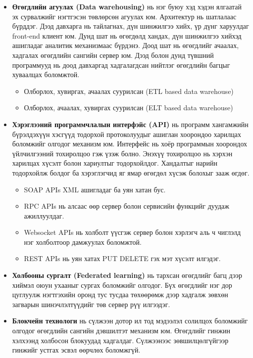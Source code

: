 \begin{itemize}
    \item \textbf{Өгөгдлийн агуулах (Data warehousing)} нь нэг буюу хэд хэдэн ялгаатай эх сурвалжийг нэгтгэсэн төвлөрсөн агуулах юм. Архитектур нь шатлалаас бүрддэг. Дээд давхарга нь тайлагнах, дүн шинжилгээ хийх, үр дүнг харуулдаг front-end клиент юм. Дунд шат нь өгөгдөлд хандах, дүн шинжилгээ хийхэд ашигладаг аналитик механизмаас бүрдэнэ. Доод шат нь өгөгдлийг ачаалах, хадгалах өгөгдлийн сангийн сервер юм. Дээд болон дунд түвшний программууд нь доод давхаргад хадгалагдсан нийтлэг өгөгдлийн багцыг хуваалцах боломжтой.
          \begin{itemize}
              \item Олборлох, хувиргах, ачаалах суурилсан (ETL based data warehouse)
              \item Олборлох, ачаалах, хувиргах суурилсан (ELT based data warehouse)
          \end{itemize}

    \item \textbf{Хэрэглээний программчлалын интерфэйс (API)} нь программ хангамжийн бүрэлдэхүүн хэсгүүд тодорхой протоколуудыг ашиглан хоорондоо харилцах боломжийг олгодог механизм юм. Интерфейс нь хоёр программын хоорондох үйлчилгээний тохиролцоо гэж үзэж болно. Энэхүү тохиролцоо нь хэрхэн харилцах хүсэлт болон хариултыг тодорхойлдог. Хандалтыг нарийн тодорхойлж болдог ба хэрэглэгчид яг ямар өгөгдөл хүсэж болохыг зааж өгдөг.
          \begin{itemize}
              \item SOAP APIs XML ашигладаг ба уян хатан бус.
              \item RPC APIs нь алсаас өөр сервер болон сервисийн функцийг дуудаж ажиллуулдаг.
              \item Websocket APIs нь холболт үүсгэж сервер болон хэрлэгч аль ч чиглэлд нэг холболтоор дамжуулах боломжтой.
              \item REST APIs нь уян хатах PUT DELETE гэх мэт хүсэлт илгэдэг.
          \end{itemize}

    \item \textbf{Холбооны сургалт (Federated learning)} нь тархсан өгөгдлийг багц дээр хиймэл оюун ухааныг сургах боломжийг олгодог. Бүх өгөгдлийг нэг дор цуглуулж нэгтгэхийн оронд тус тусдаа төхөөрөмж дээр хадгалж зөвхөн загварын шинэчлэлтүүдийг төв сервер рүү илгээдэг.

    \item \textbf{Блокчейн технологи} нь сүлжээн дотор ил тод мэдээлэл солилцох боломжийг олгодог өгөгдлийн сангийн дэвшилтэт механизм юм. Өгөгдлийг гинжин хэлхээнд холбосон блокуудад хадгалдаг. Сүлжээнээс зөвшилцөлгүйгээр гинжийг устгах эсвэл өөрчлөх боломжгүй.


\end{itemize}
